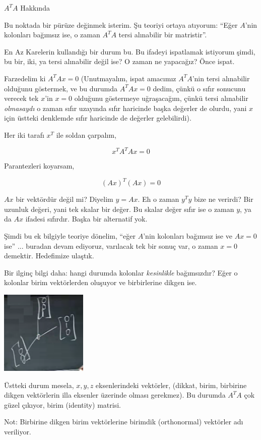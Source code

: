 \documentclass[12pt,fleqn]{article}\usepackage{../../common}
\begin{document}
$A^TA$ Hakkında

Bu noktada bir pürüze değinmek isterim. Şu teoriyi ortaya atıyorum: ``Eğer
$A$'nin kolonları bağımsız ise, o zaman $A^TA$ tersi alınabilir bir
matristir''.

En Az Karelerin kullandığı bir durum bu. Bu ifadeyi ispatlamak istiyorum
şimdi, bu bir, iki, ya tersi alınabilir değil ise? O zaman ne yapacağız?
Önce ispat. 

Farzedelim ki $A^TAx=0$ (Unutmayalım, ispat amacımız $A^TA$'nin tersi
alınabilir olduğunu göstermek, ve bu durumda $A^TAx=0$ dedim, çünkü o sıfır
sonucunu verecek tek $x$'in $x=0$ olduğunu göstermeye uğraşacağım, çünkü
tersi alınabilir {\em olmasaydı} o zaman sıfır uzayında sıfır haricinde
başka değerler de olurdu, yani $x$ için üstteki denklemde sıfır haricinde
de değerler gelebilirdi).

Her iki tarafı $x^T$ ile soldan çarpalım, 

$$ x^TA^TAx = 0 $$

Parantezleri koyarsam, 

$$ (Ax)^T(Ax) = 0 $$

$Ax$ bir vektördür değil mi? Diyelim $y=Ax$. Eh o zaman $y^Ty$ bize ne
verirdi? Bir uzunluk değeri, yani tek skalar bir değer. Bu skalar değer
sıfır ise o zaman $y$, ya da $Ax$ ifadesi sıfırdır. Başka bir alternatif
yok.

Şimdi bu ek bilgiyle teoriye dönelim, ``eğer $A$'nin kolonları bağımsız ise
ve $Ax=0$ ise'' ... buradan devam ediyoruz, varılacak tek bir sonuç var, o
zaman $x=0$ demektir. Hedefimize ulaştık. 

Bir ilginç bilgi daha: hangi durumda kolonlar {\em kesinlikle} bağımsızdır?
Eğer o kolonlar birim vektörlerden oluşuyor ve birbirlerine dikgen ise.

\includegraphics[height=4cm]{16_7.png}

Üstteki durum mesela, $x,y,z$ eksenlerindeki vektörler, (dikkat, birim,
birbirine dikgen vektörlerin illa eksenler üzerinde olması gerekmez). Bu
durumda $A^TA$ çok güzel çıkıyor, birim (identity) matrisi. 

Not: Birbirine dikgen birim vektörlerine birimdik (orthonormal) vektörler
adı veriliyor. 
\end{document}

